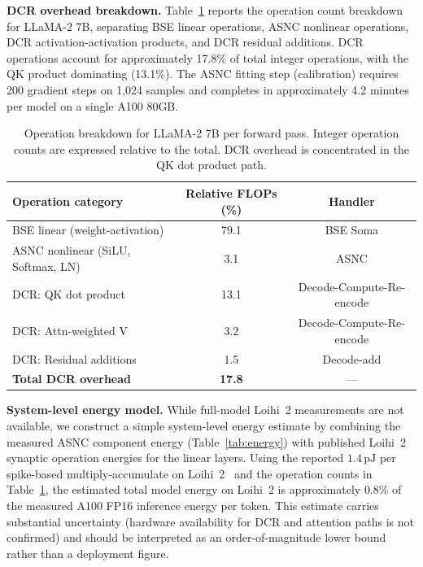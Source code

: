 \documentclass{article}
\theoremstyle{plain}
\theoremstyle{definition}
\theoremstyle{remark}
\begin{document}
\noindent\textbf{DCR overhead breakdown.}
Table~\ref{tab:dcr_overhead} reports the operation count breakdown for LLaMA-2 7B,
separating BSE linear operations, ASNC nonlinear operations, DCR activation-activation
products, and DCR residual additions. DCR operations account for approximately 17.8\%
of total integer operations, with the QK product dominating (13.1\%). The ASNC
fitting step (calibration) requires 200 gradient steps on 1,024 samples and completes
in approximately 4.2 minutes per model on a single A100 80GB.

\begin{table}[h!]
\centering
\caption{Operation breakdown for LLaMA-2 7B per forward pass. Integer operation
counts are expressed relative to the total. DCR overhead is concentrated in the QK
dot product path.}
\label{tab:dcr_overhead}
\small
\begin{tabular}{lcc}
\toprule
\textbf{Operation category} & \textbf{Relative FLOPs (\%)} & \textbf{Handler} \\
\midrule
BSE linear (weight-activation)    & 79.1 & BSE Soma \\
ASNC nonlinear (SiLU, Softmax, LN) &  3.1 & ASNC \\
DCR: QK dot product               & 13.1 & Decode-Compute-Re-encode \\
DCR: Attn-weighted V              &  3.2 & Decode-Compute-Re-encode \\
DCR: Residual additions           &  1.5 & Decode-add \\
\midrule
\textbf{Total DCR overhead}       & \textbf{17.8} & --- \\
\bottomrule
\end{tabular}
\end{table}

\noindent\textbf{System-level energy model.}
While full-model Loihi~2 measurements are not available, we construct a simple
system-level energy estimate by combining the measured ASNC component energy
(Table~\ref{tab:energy}) with published Loihi~2 synaptic operation energies
for the linear layers. Using the reported $1.4\,\mathrm{pJ}$ per spike-based
multiply-accumulate on Loihi~2~\citep{davies2021loihi} and the operation
counts in Table~\ref{tab:dcr_overhead}, the estimated total model energy on
Loihi~2 is approximately $0.8\%$ of the measured A100 FP16 inference energy
per token. This estimate carries substantial uncertainty (hardware availability
for DCR and attention paths is not confirmed) and should be interpreted as an
order-of-magnitude lower bound rather than a deployment figure.
\end{document}
